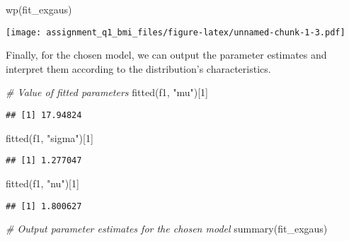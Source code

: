 \documentclass[
]{article}
\newenvironment{Shaded}{\begin{snugshade}}{\end{snugshade}}
\newcommand{\CommentTok}[1]{\textcolor[rgb]{0.56,0.35,0.01}{\textit{#1}}}
\newcommand{\DecValTok}[1]{\textcolor[rgb]{0.00,0.00,0.81}{#1}}
\newcommand{\FunctionTok}[1]{\textcolor[rgb]{0.00,0.00,0.00}{#1}}
\newcommand{\NormalTok}[1]{#1}
\newcommand{\StringTok}[1]{\textcolor[rgb]{0.31,0.60,0.02}{#1}}
\begin{document}
\begin{Shaded}
\begin{Highlighting}[]
\FunctionTok{wp}\NormalTok{(fit\_exgaus)}
\end{Highlighting}
\end{Shaded}

\texttt{[image: assignment\_q1\_bmi\_files/figure-latex/unnamed-chunk-1-3.pdf]}

Finally, for the chosen model, we can output the parameter estimates and
interpret them according to the distribution's characteristics.

\begin{Shaded}
\begin{Highlighting}[]
\CommentTok{\# Value of fitted parameters}
\FunctionTok{fitted}\NormalTok{(f1, }\StringTok{"mu"}\NormalTok{)[}\DecValTok{1}\NormalTok{]}
\end{Highlighting}
\end{Shaded}

\begin{verbatim}
## [1] 17.94824
\end{verbatim}

\begin{Shaded}
\begin{Highlighting}[]
\FunctionTok{fitted}\NormalTok{(f1, }\StringTok{"sigma"}\NormalTok{)[}\DecValTok{1}\NormalTok{]}
\end{Highlighting}
\end{Shaded}

\begin{verbatim}
## [1] 1.277047
\end{verbatim}

\begin{Shaded}
\begin{Highlighting}[]
\FunctionTok{fitted}\NormalTok{(f1, }\StringTok{"nu"}\NormalTok{)[}\DecValTok{1}\NormalTok{]}
\end{Highlighting}
\end{Shaded}

\begin{verbatim}
## [1] 1.800627
\end{verbatim}

\begin{Shaded}
\begin{Highlighting}[]
\CommentTok{\# Output parameter estimates for the chosen model}
\FunctionTok{summary}\NormalTok{(fit\_exgaus)}
\end{Highlighting}
\end{Shaded}
\end{document}
